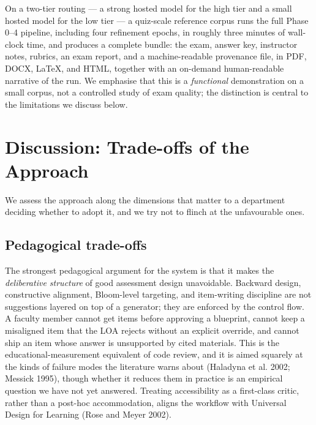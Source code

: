 \documentclass[
  11pt,
  letterpaper,
]{article}
\begin{document}
On a two-tier routing --- a strong hosted model for the high tier and a
small hosted model for the low tier --- a quiz-scale reference corpus
runs the full Phase 0--4 pipeline, including four refinement epochs, in
roughly three minutes of wall-clock time, and produces a complete
bundle: the exam, answer key, instructor notes, rubrics, an exam report,
and a machine-readable provenance file, in PDF, DOCX, LaTeX, and HTML,
together with an on-demand human-readable narrative of the run. We
emphasise that this is a \emph{functional} demonstration on a small
corpus, not a controlled study of exam quality; the distinction is
central to the limitations we discuss below.

\section{Discussion: Trade-offs of the
Approach}\label{discussion-trade-offs-of-the-approach}

We assess the approach along the dimensions that matter to a department
deciding whether to adopt it, and we try not to flinch at the
unfavourable ones.

\subsection{Pedagogical trade-offs}\label{pedagogical-trade-offs}

The strongest pedagogical argument for the system is that it makes the
\emph{deliberative structure} of good assessment design unavoidable.
Backward design, constructive alignment, Bloom-level targeting, and
item-writing discipline are not suggestions layered on top of a
generator; they are enforced by the control flow. A faculty member
cannot get items before approving a blueprint, cannot keep a misaligned
item that the LOA rejects without an explicit override, and cannot ship
an item whose answer is unsupported by cited materials. This is the
educational-measurement equivalent of code review, and it is aimed
squarely at the kinds of failure modes the literature warns about
(Haladyna et al. 2002; Messick 1995), though whether it reduces them in
practice is an empirical question we have not yet answered. Treating
accessibility as a first-class critic, rather than a post-hoc
accommodation, aligns the workflow with Universal Design for Learning
(Rose and Meyer 2002).
\end{document}
